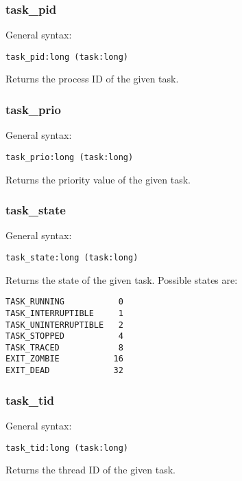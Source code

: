 \documentclass[twoside,english]{article}
\newenvironment{vindent}
{\begin{list}{}{\setlength{\listparindent}{6pt}}
\item[]}
{\end{list}}
\begin{document}
\subsubsection{task\_pid}
General syntax:

\begin{vindent}
\begin{verbatim}
task_pid:long (task:long)
\end{verbatim}
\end{vindent}
Returns the process ID of the given task.


\subsubsection{task\_prio}
General syntax:

\begin{vindent}
\begin{verbatim}
task_prio:long (task:long)
\end{verbatim}
\end{vindent}
Returns the priority value of the given task.


\subsubsection{task\_state}
General syntax:

\begin{vindent}
\begin{verbatim}
task_state:long (task:long)
\end{verbatim}
\end{vindent}
Returns the state of the given task. Possible states are:

\begin{vindent}
\begin{verbatim}
TASK_RUNNING           0
TASK_INTERRUPTIBLE     1
TASK_UNINTERRUPTIBLE   2
TASK_STOPPED           4
TASK_TRACED            8
EXIT_ZOMBIE           16
EXIT_DEAD             32
\end{verbatim}
\end{vindent}

\subsubsection{task\_tid}
General syntax:

\begin{vindent}
\begin{verbatim}
task_tid:long (task:long)
\end{verbatim}
\end{vindent}
Returns the thread ID of the given task.
\end{document}
